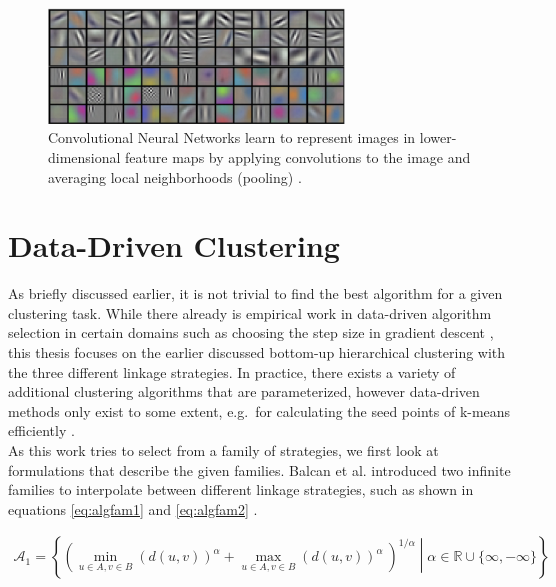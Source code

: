 \begin{figure}[h]
    \centering
    \includegraphics[width=0.7\textwidth]{images/cnn_features}
    \caption{Convolutional Neural Networks learn to represent images in lower-dimensional feature maps by applying convolutions to the image and averaging local neighborhoods (pooling) \cite{krizhevsky2012imagenet}.}
    \label{fig:cnnfeatures}
\end{figure}

\section{Data-Driven Clustering}

As briefly discussed earlier, it is not trivial to find the best algorithm for a given clustering task. While there already is empirical work in data-driven algorithm selection in certain domains such as choosing the step size in gradient descent \cite{DBLP:journals/corr/GuptaR15b}, this thesis focuses on the earlier discussed bottom-up hierarchical clustering with the three different linkage strategies. In practice, there exists a variety of additional clustering algorithms that are parameterized, however data-driven methods only exist to some extent, e.g.\ for calculating the seed points of k-means efficiently \cite{arthur2007k}.\\

As this work tries to select from a family of strategies, we first look at formulations that describe the given families. Balcan et al. introduced two infinite families to interpolate between different linkage strategies, such as shown in equations \ref{eq:algfam1} and \ref{eq:algfam2} \cite{DBLP:journals/corr/BalcanNVW16}.

\begin{equation}
    \begin{aligned}
        \mathcal{A}_1 = \left\{ \left( \min\limits_{u \in A, v \in B} (d(u,v))^\alpha + \max\limits_{u \in A, v \in B} (d(u,v))^\alpha\ \right)^{1 / \alpha} \middle| \alpha \in \mathbb{R} \cup \{\infty, -\infty\} \right\}
    \end{aligned}
    \label{eq:algfam1}
\end{equation}

